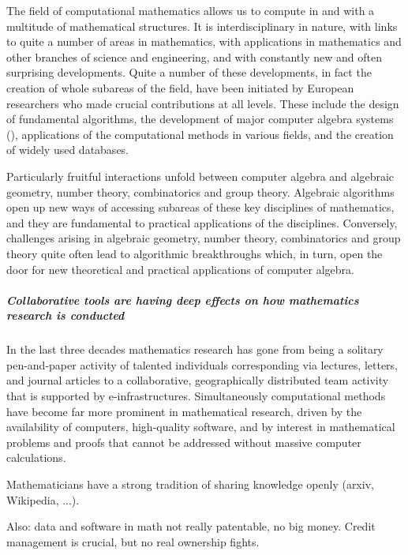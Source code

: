 The field of computational mathematics allows us to compute in and
with a multitude of mathematical structures. It is interdisciplinary
in nature, with links to quite a number of areas in mathematics, with
applications in mathematics and other branches of science and
engineering, and with constantly new and often surprising
developments. Quite a number of these developments, in fact the
creation of whole subareas of the field, have been initiated by
European researchers who made crucial contributions at all
levels. These include the design of fundamental algorithms, the
development of major computer algebra systems (), applications of the computational methods in
various fields, and the creation of widely used databases.

Particularly fruitful interactions unfold between computer algebra and
algebraic geometry, number theory, combinatorics and group theory. Algebraic algorithms
open up new ways of accessing subareas of these key disciplines of
mathematics, and they are fundamental to practical applications of the
disciplines. Conversely, challenges arising in algebraic geometry, number
theory, combinatorics and group theory quite often lead to algorithmic breakthroughs
which, in turn, open the door for new theoretical and practical applications
of computer algebra.

\subparagraph{Collaborative tools are having deep effects on how
  mathematics research is conducted}

    In the last three decades mathematics research has gone from being
    a solitary pen-and-paper activity of talented individuals
    corresponding via lectures, letters, and journal articles to a
    collaborative, geographically distributed team activity that is
    supported by e-infrastructures. Simultaneously computational
    methods have become far more prominent in mathematical research,
    driven by the availability of computers, high-quality software,
    and by interest in mathematical problems and proofs that cannot be
    addressed without massive computer calculations. 

Mathematicians have a strong tradition of sharing knowledge openly
(arxiv, Wikipedia, ...).

Also: data and software in math not really patentable, no big money.
Credit management is crucial, but no real ownership fights.

